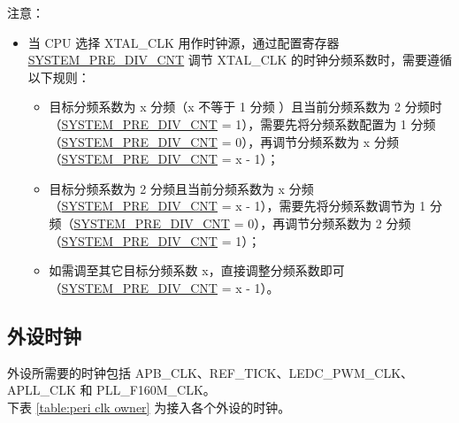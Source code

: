 \documentclass[main\_\_CN.tex]{subfiles}
\begin{document}
注意：
    \begin{itemize}
        \item 当 CPU 选择 XTAL\_CLK 用作时钟源，通过配置寄存器 \hyperref[fielddesc:SYSTEMPREDIVCNT]{SYSTEM\_PRE\_DIV\_CNT} 调节 XTAL\_CLK 的时钟分频系数时，需要遵循以下规则：
        \begin{itemize}
            \item 目标分频系数为 x 分频（x 不等于 1 分频 ）且当前分频系数为 2 分频时（\hyperref[fielddesc:SYSTEMPREDIVCNT]{SYSTEM\_PRE\_DIV\_CNT} = 1），需要先将分频系数配置为 1 分频（\hyperref[fielddesc:SYSTEMPREDIVCNT]{SYSTEM\_PRE\_DIV\_CNT} = 0），再调节分频系数为 x 分频（\hyperref[fielddesc:SYSTEMPREDIVCNT]{SYSTEM\_PRE\_DIV\_CNT} = x - 1）；
            \item 目标分频系数为 2 分频且当前分频系数为 x 分频（\hyperref[fielddesc:SYSTEMPREDIVCNT]{SYSTEM\_PRE\_DIV\_CNT} = x - 1），需要先将分频系数调节为 1 分频（\hyperref[fielddesc:SYSTEMPREDIVCNT]{SYSTEM\_PRE\_DIV\_CNT} = 0），再调节分频系数为 2 分频（\hyperref[fielddesc:SYSTEMPREDIVCNT]{SYSTEM\_PRE\_DIV\_CNT} = 1）；
            \item 如需调至其它目标分频系数 x，直接调整分频系数即可（\hyperref[fielddesc:SYSTEMPREDIVCNT]{SYSTEM\_PRE\_DIV\_CNT} = x - 1）。
        \end{itemize}
    \end{itemize}

\subsection{外设时钟}
外设所需要的时钟包括 APB\_CLK、REF\_TICK、LEDC\_PWM\_CLK、APLL\_CLK 和 PLL\_F160M\_CLK。\\
下表 \ref{table:peri clk owner} 为接入各个外设的时钟。
\end{document}
